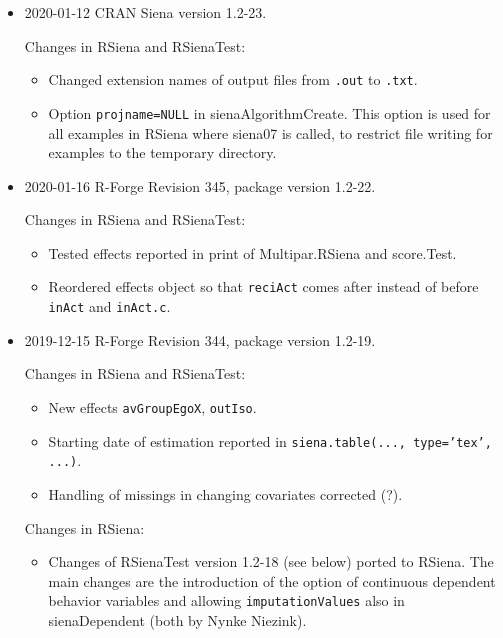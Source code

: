 \documentclass[a4paper,fleqn,11pt]{article}
\newcommand{\+}{\, + \,}
\newcommand{\sfn}[1]{\textsf{#1}}
\begin{document}
\begin{small}
\begin{itemize}
\item 2020-01-12 CRAN Siena version 1.2-23.

Changes in RSiena and RSienaTest:
\begin{itemize}
\item Changed extension names of output files from \texttt{.out} to
    \texttt{.txt}.
\item Option \texttt{projname=NULL} in \sfn{sienaAlgorithmCreate}.
     This option is used for all examples in \sfn{RSiena} where \sfn{siena07} is called,
     to restrict file writing for examples to the temporary directory.
\end{itemize}



\item 2020-01-16 R-Forge Revision 345, package version 1.2-22.

Changes in RSiena and RSienaTest:
\begin{itemize}
\item Tested effects reported in print of \sfn{Multipar.RSiena} and
        \sfn{score.Test}.
\item Reordered effects object so that \texttt{reciAct} comes after instead of
     before \texttt{inAct} and \texttt{inAct.c}.
\end{itemize}


\item 2019-12-15 R-Forge Revision 344, package version 1.2-19.

Changes in RSiena and RSienaTest:
\begin{itemize}
 \item New effects \texttt{avGroupEgoX}, \texttt{outIso}.
 \item Starting date of estimation reported in
     \texttt{siena.table(..., type='tex', ...)}.
\item Handling of missings in changing covariates corrected (?).
\end{itemize}

Changes in RSiena:
\begin{itemize}
 \item Changes of RSienaTest version 1.2-18 (see below)
      ported to RSiena.
      The main changes are the introduction of the option of
      continuous dependent behavior variables
      and allowing  \texttt{imputationValues} also in \sfn{sienaDependent}
      (both by Nynke Niezink).
\end{itemize}


\end{itemize}
\end{small}
\end{document}
